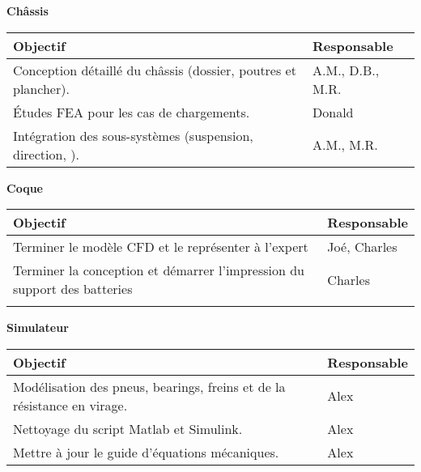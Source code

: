 \textbf{\large Ch\^assis}\\
\begin{tabularx}{\linewidth}{
    |>{\hsize=1.75\hsize}X|%
    >{\hsize=0.25\hsize}X|%
  }
    \hline
    \textbf{Objectif} & \textbf{Responsable} \\\hline
       Conception détaillé du ch\^assis (dossier, poutres et plancher). & A.M., D.B., M.R.\\\hline 
       Études FEA pour les cas de chargements. & Donald\\\hline
       Intégration des sous-systèmes (suspension, direction, ). & A.M., M.R. \\\hline 
\end{tabularx}



\hfill \break
\textbf{\large Coque}\\
\begin{tabularx}{\linewidth}{
    |>{\hsize=1.75\hsize}X|%
    >{\hsize=0.25\hsize}X|%
  }
    \hline
    \textbf{Objectif} & \textbf{Responsable} \\\hline
       Terminer le modèle CFD et le représenter à l'expert & Joé, Charles \\\hline
       Terminer la conception et démarrer l'impression du support des batteries & Charles\\\hline
       \\\hline 
\end{tabularx}



\hfill \break
\textbf{\large Simulateur}\\
\begin{tabularx}{\linewidth}{
    |>{\hsize=1.75\hsize}X|%
    >{\hsize=0.25\hsize}X|%
  }
    \hline
    \textbf{Objectif} & \textbf{Responsable} \\\hline
       Modélisation des pneus, bearings, freins et de la résistance en virage.&Alex \\\hline 
       Nettoyage du script Matlab et Simulink.&Alex \\\hline
       Mettre à jour le guide d'équations mécaniques.&Alex \\\hline 
\end{tabularx}



